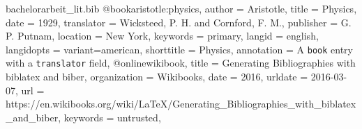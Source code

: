 \begin{filecontents}{bachelorarbeit_lit.bib} 
    @book{aristotle:physics, 
        author       = {Aristotle}, 
        title        = {Physics}, 
        date         = 1929, 
        translator   = {Wicksteed, P. H. and Cornford, F. M.}, 
        publisher    = {G. P. Putnam}, 
        location     = {New York}, 
        keywords     = {primary}, 
        langid       = {english}, 
        langidopts   = {variant=american}, 
        shorttitle   = {Physics}, 
        annotation   = {A \texttt{book} entry with a \texttt{translator} field}, 
    }
    @online{wikibook,
        title        = {Generating Bibliographies with biblatex and biber},
        organization = {Wikibooks},
        date         = {2016},
        urldate      = {2016-03-07},
        url          = {https://en.wikibooks.org/wiki/LaTeX/Generating_Bibliographies_with_biblatex_and_biber},
        keywords     = {untrusted},
    }
\end{filecontents} 